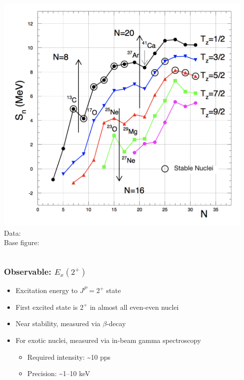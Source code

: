 \documentclass[accentcolor=tud2c,usenames,dvipsnames,colorbacktitle,inverttitle,landscape,german,presentation,t]{tudbeamer}
\begin{document}
\begin{frame}
\begin{columns}[c]
\begin{column}{0.5\textwidth}
\begin{center}
          \includegraphics[width=0.95\textwidth]{images/ozawa_modified}
          \\ \small{Data:~\cite{Ozawa:2000gj}}
          \\ \small{Base figure:~\cite{Obertelli:2018personal}}
        \end{center}
      \end{column}
    \end{columns}
  \end{frame}

  \begin{frame}
    \frametitle{Observable: $E_x(2^+)$}
    \begin{itemize}
      \item Excitation energy to $J^P=2^+$ state
      \item First excited state is $2^+$ in almost all even-even nuclei
      \item Near stability, measured via $\beta$-decay
      \item For exotic nuclei, measured via in-beam gamma spectroscopy
      \begin{itemize}
        \item Required intensity: \textasciitilde10 pps
        \item Precision: \textasciitilde1--10 keV
      \end{itemize}
    \end{itemize}
  \end{frame}
\end{document}
